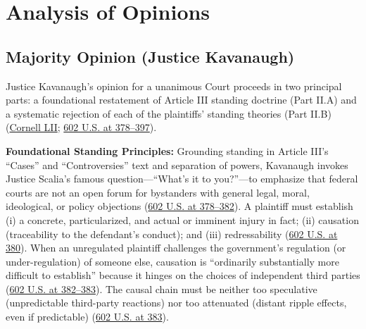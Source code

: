 \documentclass[12pt]{article}
\begin{document}
\section{Analysis of Opinions}

\subsection{Majority Opinion (Justice Kavanaugh)}

Justice Kavanaugh's opinion for a unanimous Court proceeds in two principal parts: a foundational restatement of Article III standing doctrine (Part II.A) and a systematic rejection of each of the plaintiffs' standing theories (Part II.B) (\href{https://www.law.cornell.edu/supremecourt/text/23-235}{Cornell LII}; \href{https://www.supremecourt.gov/opinions/23pdf/602us1r35_bqmd.pdf}{602 U.S. at 378--397}).

\textbf{Foundational Standing Principles:} Grounding standing in Article III's ``Cases'' and ``Controversies'' text and separation of powers, Kavanaugh invokes Justice Scalia's famous question---``What's it to you?''---to emphasize that federal courts are not an open forum for bystanders with general legal, moral, ideological, or policy objections (\href{https://www.supremecourt.gov/opinions/23pdf/602us1r35_bqmd.pdf}{602 U.S. at 378--382}). A plaintiff must establish (i) a concrete, particularized, and actual or imminent injury in fact; (ii) causation (traceability to the defendant's conduct); and (iii) redressability (\href{https://www.supremecourt.gov/opinions/23pdf/602us1r35_bqmd.pdf}{602 U.S. at 380}). When an unregulated plaintiff challenges the government's regulation (or under-regulation) of someone else, causation is ``ordinarily substantially more difficult to establish'' because it hinges on the choices of independent third parties (\href{https://www.supremecourt.gov/opinions/23pdf/602us1r35_bqmd.pdf}{602 U.S. at 382--383}). The causal chain must be neither too speculative (unpredictable third-party reactions) nor too attenuated (distant ripple effects, even if predictable) (\href{https://www.supremecourt.gov/opinions/23pdf/602us1r35_bqmd.pdf}{602 U.S. at 383}).
\end{document}
